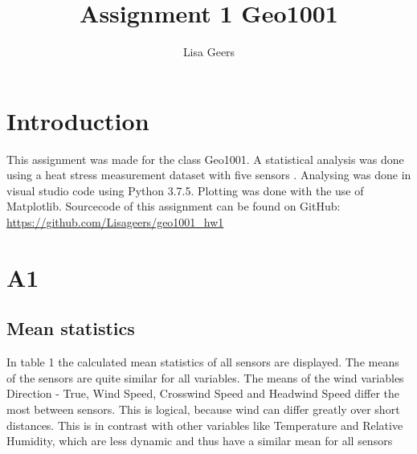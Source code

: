 \documentclass{article}
\title{Assignment 1 Geo1001}
\author{Lisa Geers}
\begin{document}
\maketitle

\section{Introduction}
    This assignment was made for the class Geo1001. A statistical analysis was done 
    using a heat stress measurement dataset with five sensors \cite{data} . Analysing was
    done in visual studio code using Python 3.7.5. Plotting was done with the use of Matplotlib.
    Sourcecode of this assignment can be found on GitHub: \url{https://github.com/Lisageers/geo1001_hw1}

\section{A1}

    \subsection{Mean statistics}

        In table 1 the calculated mean statistics of all sensors are displayed. The means of the sensors are
        quite similar for all variables. The means of the wind variables Direction - True, Wind Speed, 
        Crosswind Speed and Headwind Speed differ the most between sensors. This is logical, because 
        wind can differ greatly over short distances. This is in contrast with other variables 
        like Temperature and Relative Humidity, which are less dynamic and thus have a similar mean for all 
        sensors
\end{document}
